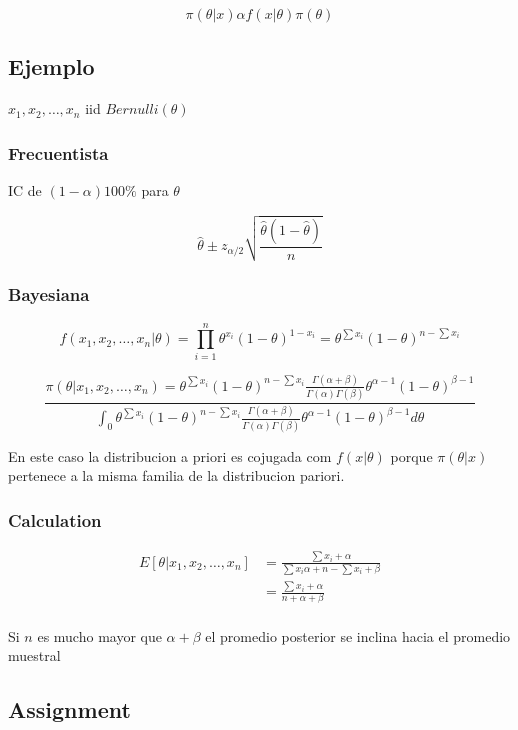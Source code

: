 \documentclass[10pt, oneside]{article}
\begin{document}
$$
	\pi(\theta|x) \alpha f(x|\theta) \pi(\theta)
$$

\subsection{Ejemplo}

$x_1, x_2, \ldots, x_n$ iid $Bernulli(\theta)$

\subsubsection{Frecuentista}

IC de $(1-\alpha)100\%$ para $\theta$

$$
	\hat{\theta} \pm z_{\alpha/2} \sqrt{\frac{\hat{\theta}(1-\hat{\theta})}{n}}
$$


\subsubsection{Bayesiana}

$$
	f(x_1, x_2, \ldots, x_n|\theta) = \prod_{i=1}^{n} \theta^{x_i} (1-\theta)^{1-x_i} = \theta^{\sum x_i} (1-\theta)^{n-\sum x_i}
$$

$$
	\frac{\pi(\theta| x_1, x_2, \ldots, x_n) = \theta^{\sum x_i} (1-\theta)^{n-\sum x_i} \frac{\Gamma(\alpha + \beta)}{\Gamma(\alpha) \Gamma(\beta)}\theta^{\alpha - 1} (1-\theta)^{\beta - 1}}
	{\int_{0} \theta^{\sum x_i} (1-\theta)^{n-\sum x_i} \frac{\Gamma(\alpha + \beta)}{\Gamma(\alpha) \Gamma(\beta)}\theta^{\alpha - 1} (1-\theta)^{\beta - 1} d\theta}
$$

En este caso la distribucion a priori es cojugada com $f(x|\theta)$ porque $\pi(\theta|x)$ pertenece a la misma
familia de la distribucion pariori.

\subsubsection{Calculation}
\[
	\begin{split}
		E[\theta|x_1, x_2, \ldots, x_n] & = \frac{\sum x_i + \alpha}{\sum x_i \alpha + n - \sum x_i + \beta} \\
		&= \frac{\sum x_i + \alpha}{n + \alpha + \beta} \\
	\end{split}
\]

Si $n$ es mucho mayor que $\alpha + \beta$ el promedio posterior se inclina hacia el promedio muestral

\subsection{Assignment}
\end{document}
